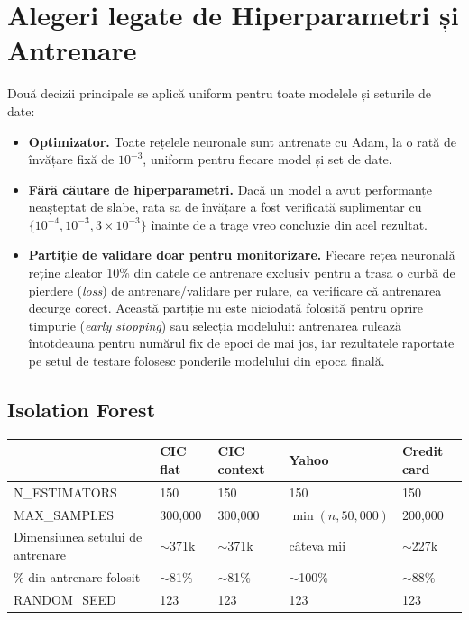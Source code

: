 \chapter{Alegeri legate de Hiperparametri și Antrenare}
\label{sec:architecture}

Două decizii principale se aplică uniform pentru toate modelele și seturile de date:

\begin{itemize}
  \item \textbf{Optimizator.} Toate rețelele neuronale sunt antrenate cu Adam, la o rată de învățare fixă de $10^{-3}$, uniform pentru fiecare model și set de date.
  \item \textbf{Fără căutare de hiperparametri.} Dacă un model a avut performanțe neașteptat de slabe, rata sa de învățare a fost verificată suplimentar cu $\{10^{-4}, 10^{-3}, 3\times10^{-3}\}$ înainte de a trage vreo concluzie din acel rezultat.
  \item \textbf{Partiție de validare doar pentru monitorizare.} Fiecare rețea neuronală reține aleator 10\% din datele de antrenare exclusiv pentru a trasa o curbă de pierdere (\emph{loss}) de antrenare/validare per rulare, ca verificare că antrenarea decurge corect. Această partiție nu este niciodată folosită pentru oprire timpurie (\emph{early stopping}) sau selecția modelului: antrenarea rulează întotdeauna pentru numărul fix de epoci de mai jos, iar rezultatele raportate pe setul de testare folosesc ponderile modelului din epoca finală.
\end{itemize}

\section{Isolation Forest}

\begin{center}
\begin{tabular}{@{}lllll@{}}
\toprule
 & CIC flat & CIC context & Yahoo & Credit card \\
\midrule
N\_ESTIMATORS & 150 & 150 & 150 & 150 \\
MAX\_SAMPLES & 300{,}000 & 300{,}000 & $\min(n, 50{,}000)$ & 200{,}000 \\
Dimensiunea setului de antrenare & $\sim$371k & $\sim$371k & câteva mii & $\sim$227k \\
\% din antrenare folosit & $\sim$81\% & $\sim$81\% & $\sim$100\% & $\sim$88\% \\
RANDOM\_SEED & 123 & 123 & 123 & 123 \\
\bottomrule
\end{tabular}
\end{center}

